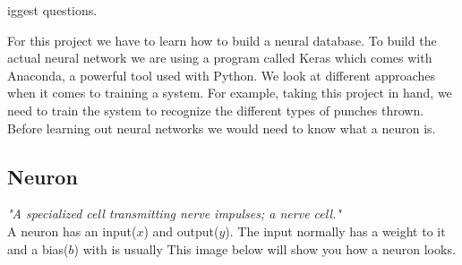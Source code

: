 \documentclass[a4paper,12pt]{report}
\begin{document}
iggest questions. \cite{bostrom2014ethics}

For this project we have to learn how to build a neural database. To build the actual neural network we are using a program called Keras which comes with Anaconda, a powerful tool used with Python. We look at different approaches when it comes to training a system. For example, taking this project in hand, we need to train the system to recognize the different types of punches thrown. Before learning out neural networks we would need to know what a neuron is.

\subsection{Neuron}
\textit{"A specialized cell transmitting nerve impulses; a nerve cell."} \\ A neuron has an input($x$) and output($y$). The input normally has a weight to it and a bias($b$) with is usually This image below will show you how a neuron looks.
\end{document}
